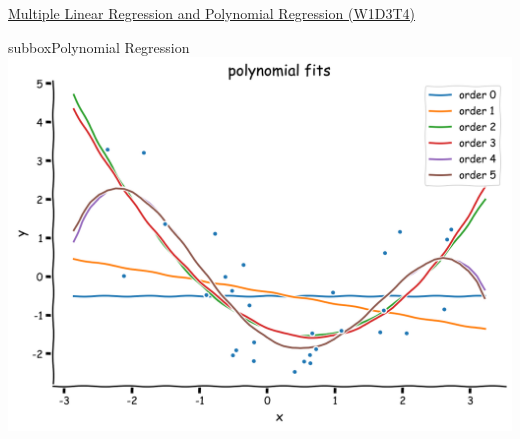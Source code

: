\begin{textbox}{\href{https://compneuro.neuromatch.io/tutorials/W1D3_ModelFitting/student/W1D3_Tutorial4.html}{Multiple Linear Regression and Polynomial Regression (W1D3T4)}   }
\begin{subbox}{subbox}{Polynomial Regression}
\centering
\includegraphics[scale=0.1]{Figures/ModelFitting/MFFigure4.png}
\end{subbox}
\end{textbox}
